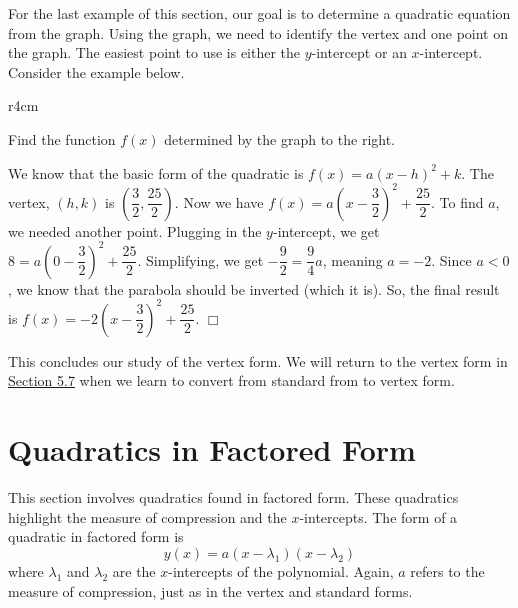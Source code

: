\documentclass[lang=en,11pt]{elegantbook}
\begin{document}
For the last example of this section, our goal is to determine a quadratic equation from the graph.  Using the graph, we need to identify the vertex and one point on the graph.  The easiest point to use is either the $y$-intercept or an $x$-intercept.  Consider the example below.
\begin{wrapfigure}{r}{4cm}
\end{wrapfigure}
\begin{example}
Find the function $f(x)$ determined by the graph to the right.
\end{example}
\begin{solution}
We know that the basic form of the quadratic is $f(x)=a(x-h)^2+k$.  The vertex, $(h,k)$ is $\left(\dfrac{3}{2},\dfrac{25}{2}\right)$.  Now we have $f(x)=a\left(x-\dfrac{3}{2}\right)^2+\dfrac{25}{2}$.  To find $a$, we needed another point.  Plugging in the $y$-intercept, we get $8=a\left(0-\dfrac{3}{2}\right)^2+\dfrac{25}{2}$.  Simplifying, we get $-\dfrac{9}{2}=\dfrac{9}{4}a$, meaning $a=-2$.  Since $a<0$, we know that the parabola should be inverted (which it is).  So, the final result is $f(x)=-2\left(x-\dfrac{3}{2}\right)^2+\dfrac{25}{2}$.  $\Box$
\end{solution}
This concludes our study of the vertex form.  We will return to the vertex form in \hyperlink{section.5.7}{Section 5.7} when we learn to convert from standard from to vertex form.  
\section{Quadratics in Factored Form}
This section involves quadratics found in factored form.  These quadratics highlight the measure of compression and the $x$-intercepts.  The form of a quadratic in factored form is $$y(x)=a(x-\lambda_1)(x-\lambda_2)$$ where $\lambda_1$ and $\lambda_2$ are the $x$-intercepts of the polynomial.  Again, $a$ refers to the measure of compression, just as in the vertex and standard forms.  
\end{document}
